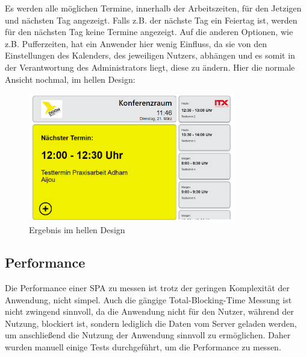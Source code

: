 Es werden alle möglichen Termine, innerhalb der Arbeitszeiten, für den Jetzigen und nächsten Tag angezeigt.
Falls z.B. der nächste Tag ein Feiertag ist, werden für den nächsten Tag keine Termine angezeigt.
Auf die anderen Optionen, wie z.B. Pufferzeiten, hat ein Anwender hier wenig Einfluss, da sie von den Einstellungen des Kalenders, des jeweiligen Nutzers, abhängen und es somit in der Verantwortung des Administrators liegt, diese zu ändern.
\newline
\newline
Hier die normale Ansicht nochmal, im hellen Design:
\par\vspace{1cm}
\begin{figure}[h]
    \centering
    \includegraphics[width=0.8\textwidth]{Bilder/Ergebnis_lightMode}
    \caption{Ergebnis im hellen Design}
    \label{fig:Ergebnis im hellen Design}
\par\vspace{1cm}
\end{figure}
\justifying
\newline
\newline
\pagebreak
\subsection{Performance}\label{subsec:performance}
Die Performance einer \gls{SPA} zu messen ist trotz der geringen Komplexität der Anwendung, nicht simpel.
Auch die gängige Total-Blocking-Time Messung ist nicht zwingend sinnvoll, da die Anwendung nicht für den Nutzer, während der Nutzung, blockiert ist, sondern lediglich die Daten vom Server geladen werden, um anschließend die Nutzung der Anwendung sinnvoll zu ermöglichen.
Daher wurden manuell einige Tests durchgeführt, um die Performance zu messen.
\newline
\newline
